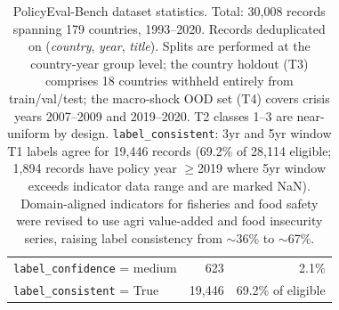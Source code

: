 \begin{table}[t]
\begin{tabular}{lrr}
\texttt{label\_confidence} = medium & 623 & 2.1\% \\
\texttt{label\_consistent} = True & 19,446 & 69.2\% of eligible \\
\bottomrule
\end{tabular}
\caption{PolicyEval-Bench dataset statistics. Total: 30,008 records spanning
179 countries, 1993--2020. Records deduplicated on (\textit{country}, \textit{year}, \textit{title}). Splits are performed at the
country-year group level; the country holdout (T3) comprises 18 countries
withheld entirely from train/val/test; the macro-shock OOD set (T4) covers
crisis years 2007--2009 and 2019--2020. T2 classes 1--3 are near-uniform
by design. \texttt{label\_consistent}: 3yr and 5yr window T1 labels agree
for 19,446 records (69.2\% of 28,114 eligible; 1,894 records have policy
year $\ge$2019 where 5yr window exceeds indicator data range and are
marked NaN). Domain-aligned indicators for fisheries and food safety were
revised to use agri value-added and food insecurity series, raising label
consistency from $\sim$36\% to $\sim$67\%.}
\label{tab:dataset_stats}
\end{table}
